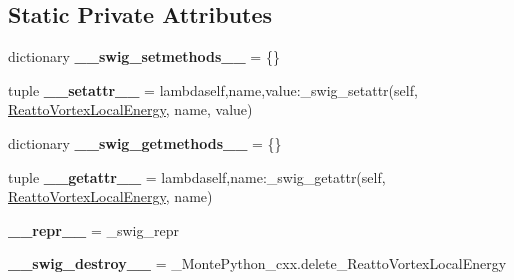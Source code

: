 \subsection*{Static Private Attributes}
\begin{DoxyCompactItemize}
\item 
\hypertarget{classMontePython__cxx_1_1ReattoVortexLocalEnergy_a07ebfbaca3a78b9f7074d203cb846c3b}{}dictionary {\bfseries \+\_\+\+\_\+swig\+\_\+setmethods\+\_\+\+\_\+} = \{\}\label{classMontePython__cxx_1_1ReattoVortexLocalEnergy_a07ebfbaca3a78b9f7074d203cb846c3b}

\item 
\hypertarget{classMontePython__cxx_1_1ReattoVortexLocalEnergy_acf70aa22cb2e918ecf86a96fceac8efc}{}tuple {\bfseries \+\_\+\+\_\+setattr\+\_\+\+\_\+} = lambdaself,name,value\+:\+\_\+swig\+\_\+setattr(self, \hyperlink{classMontePython__cxx_1_1ReattoVortexLocalEnergy}{Reatto\+Vortex\+Local\+Energy}, name, value)\label{classMontePython__cxx_1_1ReattoVortexLocalEnergy_acf70aa22cb2e918ecf86a96fceac8efc}

\item 
\hypertarget{classMontePython__cxx_1_1ReattoVortexLocalEnergy_aaf45cd5628335b951618b3c5e58c46c8}{}dictionary {\bfseries \+\_\+\+\_\+swig\+\_\+getmethods\+\_\+\+\_\+} = \{\}\label{classMontePython__cxx_1_1ReattoVortexLocalEnergy_aaf45cd5628335b951618b3c5e58c46c8}

\item 
\hypertarget{classMontePython__cxx_1_1ReattoVortexLocalEnergy_a3c4709871be9e1d0d11f8a3d716e0b74}{}tuple {\bfseries \+\_\+\+\_\+getattr\+\_\+\+\_\+} = lambdaself,name\+:\+\_\+swig\+\_\+getattr(self, \hyperlink{classMontePython__cxx_1_1ReattoVortexLocalEnergy}{Reatto\+Vortex\+Local\+Energy}, name)\label{classMontePython__cxx_1_1ReattoVortexLocalEnergy_a3c4709871be9e1d0d11f8a3d716e0b74}

\item 
\hypertarget{classMontePython__cxx_1_1ReattoVortexLocalEnergy_aa085999bf7665ea317729a566e0b2bf7}{}{\bfseries \+\_\+\+\_\+repr\+\_\+\+\_\+} = \+\_\+swig\+\_\+repr\label{classMontePython__cxx_1_1ReattoVortexLocalEnergy_aa085999bf7665ea317729a566e0b2bf7}

\item 
\hypertarget{classMontePython__cxx_1_1ReattoVortexLocalEnergy_a28847a94176673e39d614cb0e478f5f3}{}{\bfseries \+\_\+\+\_\+swig\+\_\+destroy\+\_\+\+\_\+} = \+\_\+\+Monte\+Python\+\_\+cxx.\+delete\+\_\+\+Reatto\+Vortex\+Local\+Energy\label{classMontePython__cxx_1_1ReattoVortexLocalEnergy_a28847a94176673e39d614cb0e478f5f3}

\end{DoxyCompactItemize}


